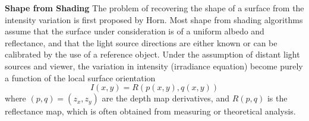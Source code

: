 
\textbf{Shape from Shading}
The problem of recovering the shape of a surface from the intensity variation is first proposed by Horn. Most shape from shading algorithms assume that the surface under consideration is of a uniform albedo and reflectance, and that the light source directions are either known or can be calibrated by the use of a reference object. Under the assumption of distant light sources and viewer, the variation in intensity (irradiance equation) become purely a function of the local surface orientation
$$
I(x, y) = R(p(x, y), q(x, y))
$$
where $(p, q) = (z_x, z_y)$ are the depth map derivatives, and $R(p, q)$ is the reflectance map, which is often obtained from measuring or theoretical analysis.

